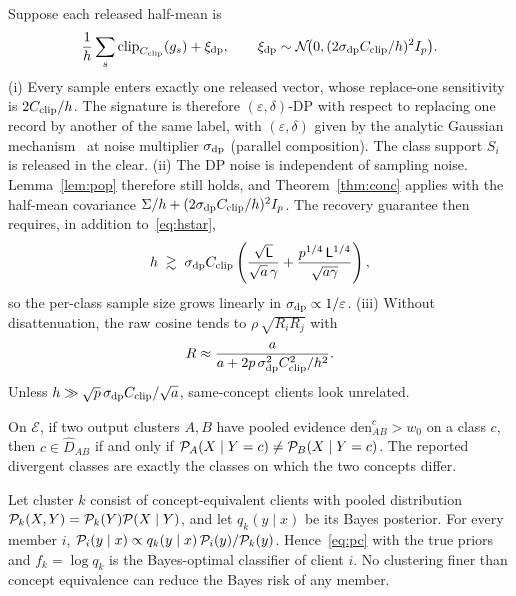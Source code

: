 \begin{proposition}\label{prop:dp}
Suppose each released half-mean is
\[
\frac1h\sum_{s}\operatorname{clip}_{C_{\rm clip}}(g_s)+\xi_{\rm dp},
\qquad
\xi_{\rm dp}\sim\mathcal N\!\big(0,(2\sigma_{\rm dp}C_{\rm clip}/h)^2I_p\big).
\]
(i) Every sample enters exactly one released vector, whose replace-one sensitivity is $2C_{\rm clip}/h$. The signature is therefore $(\varepsilon,\delta)$-DP with respect to replacing one record by another of the same label, with $(\varepsilon,\delta)$ given by the analytic Gaussian mechanism~\citep{balle2018analytic} at noise multiplier $\sigma_{\rm dp}$ (parallel composition). The class support $S_i$ is released in the clear.
(ii) The DP noise is independent of sampling noise. Lemma~\ref{lem:pop} therefore still holds, and Theorem~\ref{thm:conc} applies with the half-mean covariance $\Sigma/h+(2\sigma_{\rm dp}C_{\rm clip}/h)^2I_p$. The recovery guarantee then requires, in addition to~\eqref{eq:hstar},
\[
h\;\gtrsim\;\sigma_{\rm dp}C_{\rm clip}\left(\frac{\sqrt{\mathsf L}}{\sqrt a\,\gamma}+\frac{p^{1/4}\,\mathsf L^{1/4}}{\sqrt{a\gamma}}\right),
\]
so the per-class sample size grows linearly in $\sigma_{\rm dp}\propto1/\varepsilon$.
(iii) Without disattenuation, the raw cosine tends to $\rho\,\sqrt{R_iR_j}$ with
\[
R\approx\frac{a}{a+2p\,\sigma^2_{\rm dp}C_{\rm clip}^2/h^2}.
\]
Unless $h\gg\sqrt p\,\sigma_{\rm dp}C_{\rm clip}/\sqrt a$, same-concept clients look unrelated.
\end{proposition}

\begin{proposition}\label{prop:expl}
On $\mathcal E$, if two output clusters $A,B$ have pooled evidence $\mathrm{den}^c_{AB}>w_0$ on a class $c$, then $c\in\hat D_{AB}$ if and only if $\mathcal{P}_A(X\mid Y=c)\neq\mathcal{P}_B(X\mid Y=c)$. The reported divergent classes are exactly the classes on which the two concepts differ.
\end{proposition}

\begin{proposition}\label{prop:pc}
Let cluster $k$ consist of concept-equivalent clients with pooled distribution $\mathcal{P}_k(X,Y)=\mathcal{P}_k(Y)\mathcal{P}(X\mid Y)$, and let $q_k(y\mid x)$ be its Bayes posterior. For every member $i$, $\mathcal{P}_i(y\mid x)\propto q_k(y\mid x)\,\mathcal{P}_i(y)/\mathcal{P}_k(y)$. Hence~\eqref{eq:pc} with the true priors and $f_k=\log q_k$ is the Bayes-optimal classifier of client $i$. No clustering finer than concept equivalence can reduce the Bayes risk of any member.
\end{proposition}


